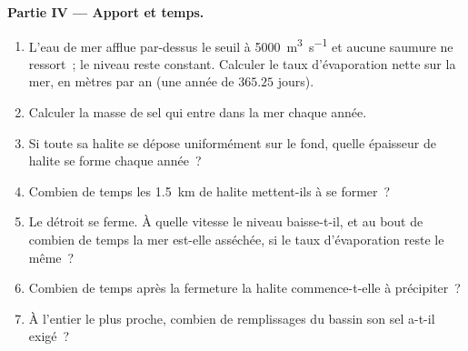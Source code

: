 \begin{problem}
\noindent\textbf{Partie IV --- Apport et temps.}
\begin{enumerate}[resume]
  \item L'eau de mer afflue par-dessus le seuil à \qty{5000}{m^3.s^{-1}} et aucune saumure
        ne ressort~; le niveau reste constant. Calculer le taux d'évaporation nette
        sur la mer, en mètres par an (une année de $365.25$ jours).
  \item Calculer la masse de sel qui entre dans la mer chaque année.
  \item Si toute sa halite se dépose uniformément sur le fond, quelle épaisseur de halite
        se forme chaque année~?
  \item Combien de temps les \qty{1.5}{km} de halite mettent-ils à se former~?
  \item Le détroit se ferme. À quelle vitesse le niveau baisse-t-il, et au bout de combien de temps
        la mer est-elle asséchée, si le taux d'évaporation reste le même~?
  \item Combien de temps après la fermeture la halite commence-t-elle à précipiter~?
  \item À l'entier le plus proche, combien de remplissages du bassin son
        sel a-t-il exigé~?
\end{enumerate}
\end{problem}
